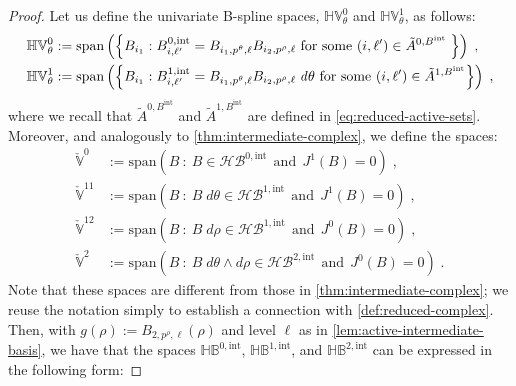 \documentclass[10pt,a4paper]{amsart}
\newcommand{\basis}[1]{\mathcal{#1}}
\newcommand{\bsp}{B}
\newcommand{\cU}{\theta}
\newcommand{\cV}{\rho}
\newcommand{\dcU}{\mathit{d\cU}}
\newcommand{\dcV}{\mathit{d\cV}}
\newcommand{\degU}{p^\cU}
\newcommand{\degV}{p^\cV}
\newcommand{\hBasis}[1]{\mathit{\basis{H}\basis{#1}}}
\newcommand{\hSpace}[1]{\mathit{\vSpace{H}\vSpace{#1}}}
\newcommand{\jet}[2]{J^{#1}\left(#2\right)}
\newcommand{\ractiveS}[2]{\tilde{A}^{#1}_{#2}}
\newcommand{\spaceSpan}[1]{\ensuremath{\text{span}}\left(#1\right)}
\newcommand{\tint}{\mathrm{int}}
\newcommand{\vSpace}[1]{\mathbb{#1}}
\begin{document}
\begin{proof}	
    Let us define the univariate B-spline spaces, $\hSpace{V}_\cU^0$ and $\hSpace{V}_\cU^1$, as follows:
    \begin{equation}\label{eq:reduced-spaces-at-pole}
        \small
        \begin{split}
            \hSpace{V}_\cU^0 &:= \spaceSpan{
                \left\{
                    \bsp_{i_1} : \bsp^{0,\tint}_{i,\ell'} = \bsp_{i_1,\degU,\ell}\bsp_{i_2,\degV,\ell}\text{ for some }(i,\ell') \in \ractiveS{0,\bsp^\tint}{}\;
                \right\}
            }\;,\\
            \hSpace{V}_\cU^1 &:= \spaceSpan{
                \left\{
                    \bsp_{i_1} : \bsp^{1,\tint}_{i,\ell'} = \bsp_{i_1,\degU,\ell}\bsp_{i_2,\degV,\ell}\;\dcU\text{ for some }(i,\ell') \in \ractiveS{1,\bsp^\tint}{}
                \right\}
            }\;,
        \end{split}
    \end{equation}
    where we recall that $\ractiveS{0,\bsp^\tint}{}$ and $\ractiveS{1,\bsp^\tint}{}$ are defined in \cref{eq:reduced-active-sets}.
    Moreover, and analogously to \cref{thm:intermediate-complex}, we define the spaces:
    \begin{equation*}
        \begin{split}
            \check{\vSpace{V}}^0 &:= \spaceSpan{B~:~B \in \hBasis{\bsp}^{0,\tint}
            ~~\text{and}~~
            \jet{1}{B} = 0}\;,\\
            \check{\vSpace{V}}^{11} &:= \spaceSpan{B~:~B\;\dcU \in \hBasis{\bsp}^{1,\tint}
            ~~\text{and}~~
            \jet{1}{B} = 0}\;,\\
            \check{\vSpace{V}}^{12} &:= \spaceSpan{B~:~B\;\dcV \in \hBasis{\bsp}^{1,\tint}
            ~~\text{and}~~
            \jet{0}{B} = 0}\;,\\
            \check{\vSpace{V}}^2 &:= \spaceSpan{B~:~B\;\dcU\wedge\dcV \in \hBasis{\bsp}^{2,\tint}
            ~~\text{and}~~
            \jet{0}{B} = 0}\;.
        \end{split}
    \end{equation*}
    Note that these spaces are different from those in \cref{thm:intermediate-complex}; we reuse the notation simply to establish a connection with \cref{def:reduced-complex}.
    Then, with $g(\cV) := \bsp_{2,\degV,\ell}(\cV)$ and level $\ell$ as in \cref{lem:active-intermediate-basis}, we have that the spaces $\hSpace{\bsp}^{0,\tint}$, $\hSpace{\bsp}^{1,\tint}$, and $\hSpace{\bsp}^{2,\tint}$ can be expressed in the following form:

\end{proof}
\end{document}
